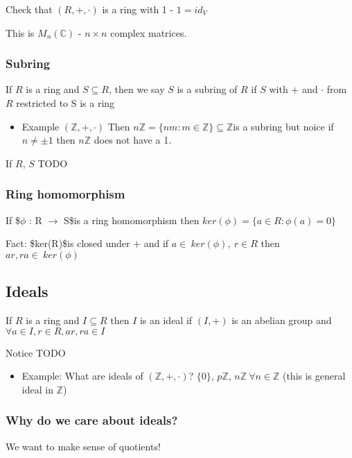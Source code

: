 \documentclass[11pt]{article}
\begin{document}
Check that \((R, +, \cdot)\) is a ring with 1 - \(1 = id_V\)

This is \(M_n(\mathbb{C})\) - \(n \times n\) complex matrices.

\subsubsection{Subring}
\label{sec:org5233038}
If \(R\) is a ring and \(S \subseteq R\), then we say \(S\) is a subring of \(R\)
if \(S\) with \(+\) and \(\cdot\) from \(R\) restricted to S is a ring

\begin{itemize}
\item Example \((\mathbb{Z}, +, \cdot)\)
Then $n\mathbb{Z} = \{nm : m \in \mathbb{Z}\} \subseteq \mathbb{Z}$is a subring
but noice if \(n \neq \pm 1\) then \(n\mathbb{Z}\) does not have a 1.
\end{itemize}

If \(R\), \(S\) TODO

\subsubsection{Ring homomorphism}
\label{sec:orgaa1a9af}
If \$\(\phi\) : R \(\to\) S\$is a ring homomorphism then \(ker(\phi) = \{a \in R : \phi(a) = 0\}\)

Fact: \$ker(R)\$is closed under \(+\)
and if \(a \in\ ker(\phi),\ r \in R\) then \(ar, ra \in\ ker(\phi)\)

\subsection{Ideals}
\label{sec:orgdfd29eb}
If \(R\) is a ring and \(I \subseteq R\) then \(I\) is an ideal
if \((I, +)\) is an abelian group and \(\forall a \in I, r \in R, ar, ra \in I\)

Notice TODO

\begin{itemize}
\item Example: What are ideals of \((\mathbb{Z}, +, \cdot)\)?
\(\{0\}\), \(p\mathbb{Z}\),
\(n\mathbb{Z}\ \forall n \in \mathbb{Z}\) (this is general ideal in $\mathbb{Z}$)
\end{itemize}

\subsubsection{Why do we care about ideals?}
\label{sec:org61f8ffd}
We want to make sense of quotients!
\end{document}

